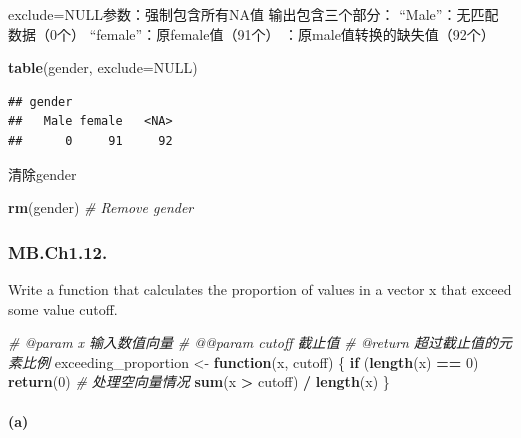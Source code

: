 \documentclass[
]{article}
\newenvironment{Shaded}{\begin{snugshade}}{\end{snugshade}}
\newcommand{\AttributeTok}[1]{\textcolor[rgb]{0.13,0.29,0.53}{#1}}
\newcommand{\CommentTok}[1]{\textcolor[rgb]{0.56,0.35,0.01}{\textit{#1}}}
\newcommand{\ConstantTok}[1]{\textcolor[rgb]{0.56,0.35,0.01}{#1}}
\newcommand{\ControlFlowTok}[1]{\textcolor[rgb]{0.13,0.29,0.53}{\textbf{#1}}}
\newcommand{\DecValTok}[1]{\textcolor[rgb]{0.00,0.00,0.81}{#1}}
\newcommand{\FunctionTok}[1]{\textcolor[rgb]{0.13,0.29,0.53}{\textbf{#1}}}
\newcommand{\NormalTok}[1]{#1}
\newcommand{\OtherTok}[1]{\textcolor[rgb]{0.56,0.35,0.01}{#1}}
\newcommand{\SpecialCharTok}[1]{\textcolor[rgb]{0.81,0.36,0.00}{\textbf{#1}}}
\begin{document}
exclude=NULL参数：强制包含所有NA值 输出包含三个部分：
``Male''：无匹配数据（0个） ``female''：原female值（91个）
：原male值转换的缺失值（92个）

\begin{Shaded}
\begin{Highlighting}[]
\FunctionTok{table}\NormalTok{(gender, }\AttributeTok{exclude=}\ConstantTok{NULL}\NormalTok{)}
\end{Highlighting}
\end{Shaded}

\begin{verbatim}
## gender
##   Male female   <NA> 
##      0     91     92
\end{verbatim}

清除gender

\begin{Shaded}
\begin{Highlighting}[]
\FunctionTok{rm}\NormalTok{(gender)  }\CommentTok{\# Remove gender}
\end{Highlighting}
\end{Shaded}

\subsubsection{MB.Ch1.12.}\label{mb.ch1.12.}

Write a function that calculates the proportion of values in a vector x
that exceed some value cutoff.

\begin{Shaded}
\begin{Highlighting}[]
\CommentTok{\#\textquotesingle{} @param x 输入数值向量}
\CommentTok{\#\textquotesingle{} @@param cutoff 截止值}
\CommentTok{\#\textquotesingle{} @return 超过截止值的元素比例}
\NormalTok{exceeding\_proportion }\OtherTok{\textless{}{-}} \ControlFlowTok{function}\NormalTok{(x, cutoff) \{}
  \ControlFlowTok{if}\NormalTok{ (}\FunctionTok{length}\NormalTok{(x) }\SpecialCharTok{==} \DecValTok{0}\NormalTok{) }\FunctionTok{return}\NormalTok{(}\DecValTok{0}\NormalTok{)  }\CommentTok{\# 处理空向量情况}
  \FunctionTok{sum}\NormalTok{(x }\SpecialCharTok{\textgreater{}}\NormalTok{ cutoff) }\SpecialCharTok{/} \FunctionTok{length}\NormalTok{(x)}
\NormalTok{\}}
\end{Highlighting}
\end{Shaded}

\paragraph{(a)}\label{a}
\end{document}
